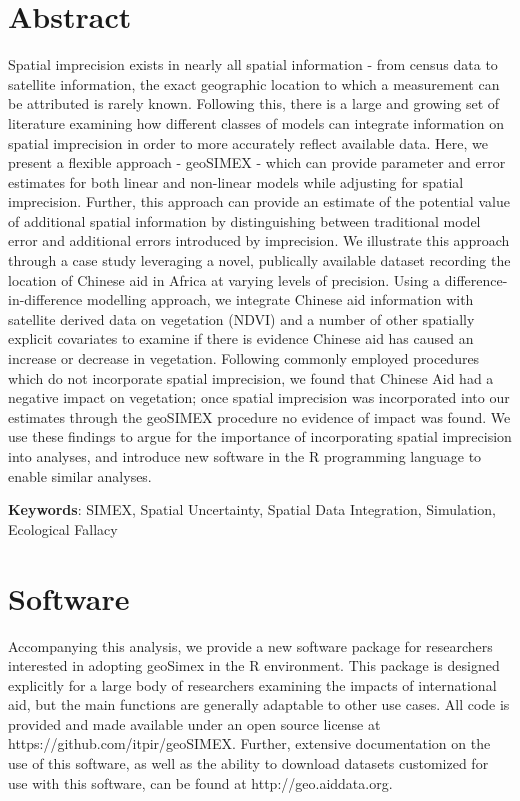 \section{Abstract}
Spatial imprecision exists in nearly all spatial information - from census data to satellite information, the exact geographic location to which a measurement can be attributed is rarely known.
Following this, there is a large and growing set of literature examining how different classes of models can integrate information on spatial imprecision in order to more accurately reflect available data.
Here, we present a flexible approach - geoSIMEX - which can provide parameter and error estimates for both linear and non-linear models while adjusting for spatial imprecision.
Further, this approach can provide an estimate of the potential value of additional spatial information by distinguishing between traditional model error and additional errors introduced by imprecision.
We illustrate this approach through a case study leveraging a novel, publically available dataset recording the location of Chinese aid in Africa at varying levels of precision.
Using a difference-in-difference modelling approach, we integrate Chinese aid information with satellite derived data on vegetation (NDVI) and a number of other spatially explicit covariates to examine if there is evidence Chinese aid has caused an increase or decrease in vegetation.
Following commonly employed procedures which do not incorporate spatial imprecision, we found that Chinese Aid had a negative impact on vegetation; once spatial imprecision was incorporated into our estimates through the geoSIMEX procedure no evidence of impact was found.
We use these findings to argue for the importance of incorporating spatial imprecision into analyses, and introduce new software in the R programming language to enable similar analyses.

\textbf{Keywords}: SIMEX, Spatial Uncertainty, Spatial Data Integration, Simulation, Ecological Fallacy\\

\section{Software}
Accompanying this analysis, we provide a new software package for researchers interested in adopting geoSimex in the R environment.
This package is designed explicitly for a large body of researchers examining the impacts of international aid, but the main functions are generally adaptable to other use cases.
All code is provided and made available under an open source license at https://github.com/itpir/geoSIMEX.
Further, extensive documentation on the use of this software, as well as the ability to download datasets customized for use with this software, can be found at http://geo.aiddata.org.
\newpage

